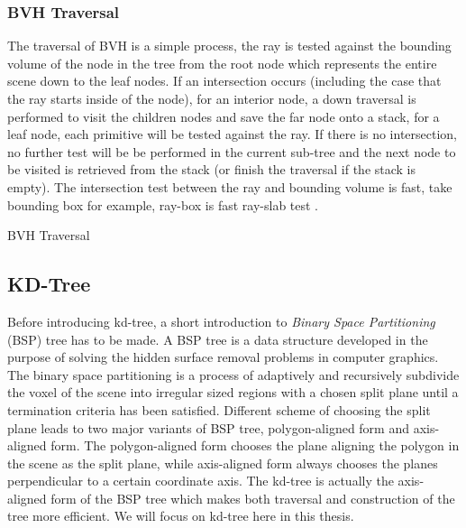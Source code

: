 \subsubsection{BVH Traversal}
\label{subsubsec:bvh_traversal}
The traversal of BVH is a simple process, the ray is tested against the bounding volume of the node in the tree from the root node which represents the entire scene down to the leaf nodes.  If an intersection occurs (including the case that the ray starts inside of the node), for an interior node, a down traversal is performed to visit the children nodes and save the far node onto a stack, for a leaf node, each primitive will be tested against the ray. If there is no intersection, no further test will be be performed in the current sub-tree and the next node to be visited is retrieved from the stack (or finish the traversal if the stack is empty). The intersection test between the ray and bounding volume is fast, take bounding box for example, ray-box is fast ray-slab test \cite{kk1986}. 

\SetAlFnt{\small}
\begin{algorithm} 
	  
	\caption{BVH Traversal}
	\label{algo:bvh_traversal} 
\end{algorithm}


\subsection{KD-Tree}
Before introducing kd-tree, a short introduction to \textit{Binary Space Partitioning} (BSP) tree has to be made. A BSP tree is a data structure developed in the purpose of solving the hidden surface removal problems in computer graphics. The binary space partitioning is a process of adaptively and recursively subdivide the voxel of the scene into irregular sized regions with a chosen split plane until a termination criteria has been satisfied. Different scheme of choosing the split plane leads to two major variants of BSP tree, polygon-aligned form and axis-aligned form. The polygon-aligned form chooses the plane aligning the polygon in the scene as the split plane, while axis-aligned form always chooses the planes perpendicular to a certain coordinate axis. The kd-tree is actually the axis-aligned form of the BSP tree which makes both traversal and construction of the tree more efficient. We will focus on kd-tree here in this thesis.

